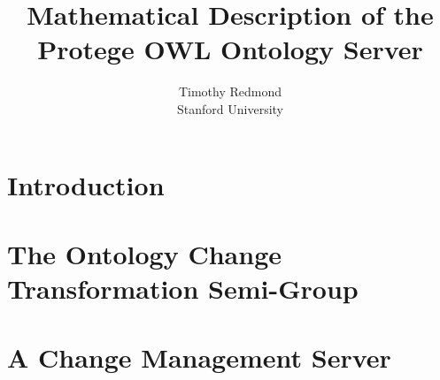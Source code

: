 \documentclass[12pt]{article}
\title{Mathematical Description of the Protege OWL Ontology Server}
\author{Timothy Redmond \\
        Stanford University}
\begin{document}
\maketitle

\section{Introduction}


\section{The Ontology Change Transformation Semi-Group}

\section{A Change Management Server}
\end{document}
